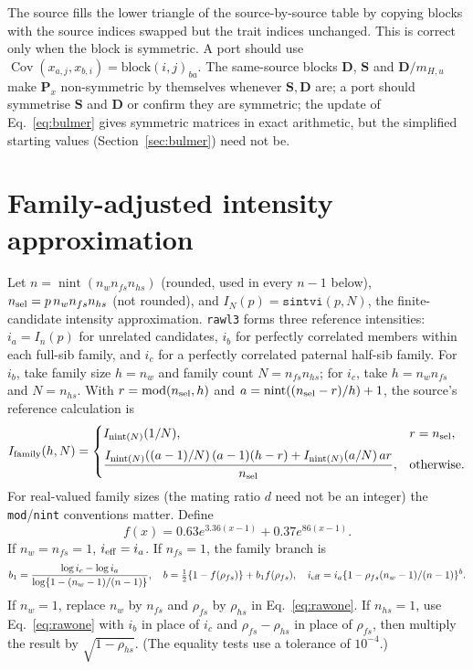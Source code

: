 \documentclass[11pt]{article}
\newcommand{\src}[1]{\texttt{#1}}
\newcommand{\Cov}{\operatorname{Cov}}
\newcommand{\ma}[1]{\mathbf{#1}}
\begin{document}
\begin{codenote}
The source fills the lower triangle of the source-by-source table by copying blocks with the source indices swapped but the trait indices unchanged. This is correct only when the block is symmetric. A port should use $\Cov(x_{a,j},x_{b,i})=\text{block}(i,j)_{ba}$. The same-source blocks $\ma D$, $\ma S$ and $\ma D/m_{H,u}$ make $\ma P_x$ non-symmetric by themselves whenever $\ma S,\ma D$ are; a port should symmetrise $\ma S$ and $\ma D$ or confirm they are symmetric; the update of Eq.~\eqref{eq:bulmer} gives symmetric matrices in exact arithmetic, but the simplified starting values (Section~\ref{sec:bulmer}) need not be.
\end{codenote}

\section{Family-adjusted intensity approximation}\label{app:rawlings}
Let $n=\operatorname{nint}(n_wn_{fs}n_{hs})$ (rounded, used in every $n-1$ below), $n_{\rm sel}=p\,n_wn_{fs}n_{hs}$ (not rounded), and $I_N(p)=\src{sintvi}(p,N)$, the finite-candidate intensity approximation. \src{rawl3} forms three reference intensities: $i_a=I_n(p)$ for unrelated candidates, $i_b$ for perfectly correlated members within each full-sib family, and $i_c$ for a perfectly correlated paternal half-sib family. For $i_b$, take family size $h=n_w$ and family count $N=n_{fs}n_{hs}$; for $i_c$, take $h=n_wn_{fs}$ and $N=n_{hs}$. With $r=\operatorname{mod}(n_{\rm sel},h)$ and $a=\operatorname{nint}((n_{\rm sel}-r)/h)+1$, the source's reference calculation is
\begin{equation}\label{eq:rawref}
I_{\rm family}(h,N)=
\begin{cases}
I_{\operatorname{nint}(N)}(1/N),&r=n_{\rm sel},\\[2mm]
\displaystyle\frac{I_{\operatorname{nint}(N)}((a-1)/N)\,(a-1)(h-r)
+I_{\operatorname{nint}(N)}(a/N)\,a r}{n_{\rm sel}},&\text{otherwise}.
\end{cases}
\end{equation}
For real-valued family sizes (the mating ratio $d$ need not be an integer) the \src{mod}/\src{nint} conventions matter. Define
\begin{equation}
f(x)=0.63e^{3.36(x-1)}+0.37e^{86(x-1)}.
\end{equation}
If $n_w=n_{fs}=1$, $i_{\rm eff}=i_a$. If $n_{fs}=1$, the family branch is
\begin{equation}\label{eq:rawone}
b_1=\frac{\log i_c-\log i_a}{\log\{1-(n_w-1)/(n-1)\}},\quad
b=\tfrac12\{1-f(\rho_{fs})\}+b_1f(\rho_{fs}),\quad
i_{\rm eff}=i_a\{1-\rho_{fs}(n_w-1)/(n-1)\}^{b}.
\end{equation}
If $n_w=1$, replace $n_w$ by $n_{fs}$ and $\rho_{fs}$ by $\rho_{hs}$ in Eq.~\eqref{eq:rawone}. If $n_{hs}=1$, use Eq.~\eqref{eq:rawone} with $i_b$ in place of $i_c$ and $\rho_{fs}-\rho_{hs}$ in place of $\rho_{fs}$, then multiply the result by $\sqrt{1-\rho_{hs}}$. (The equality tests use a tolerance of $10^{-4}$.)
\end{document}
